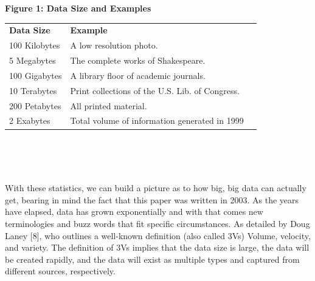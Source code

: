 \documentclass[10pt,journal,compsoc]{IEEEtran}
\begin{document}
\begin{algoBox}{\textbf{Figure 1: Data Size and Examples}}
	\begin{tabular}{lp{}r}
		\bfseries Data Size & \bfseries Example &
		\bfseries  \\[1ex]
		100 Kilobytes & A low resolution photo. \\
		5 Megabytes & The complete works of Shakespeare. \\
		100 Gigabytes & A library floor of academic journals. \\
		10 Terabytes & Print collections of the U.S. Lib. of Congress. \\
		200 Petabytes & All printed material. \\
		2 Exabytes & Total volume of information generated in 1999
	\end{tabular}\\\\\\
\end{algoBox}


With these statistics, we can build a picture as to how big, big data can actually get, bearing in mind the fact that this paper was written in 2003. As the years have elapsed, data has grown exponentially and with that comes new terminologies and buzz words that fit specific circumstances. As detailed by Doug Laney [8], who outlines a well-known definition (also called 3Vs) Volume, velocity, and variety. The definition of 3Vs implies that the data size is large, the data will be created rapidly, and the data will exist as multiple types and captured from different sources, respectively.
\end{document}

